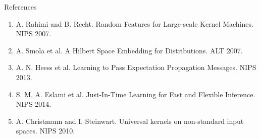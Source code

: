 \documentclass[english]{beamer}
\begin{document}
\begin{frame}
\begin{columns}[t]
\begin{block}{References}
{\footnotesize
\begin{enumerate}
\item \justifying{} { A. Rahimi and B. Recht. Random Features
for Large-scale Kernel Machines. NIPS 2007.}
\item A. Smola et al. A Hilbert Space Embedding for Distributions. ALT 2007.
\item { A. N. Heess et al. Learning to Pass Expectation Propagation Messages.
NIPS 2013. }
\item S. M. A. Eslami et al. Just-In-Time Learning for Fast and Flexible Inference.
    NIPS 2014.
\item A. Christmann and I. Steinwart. Universal kernels on non-standard input
    spaces. NIPS 2010.
\end{enumerate}
}

% 
% 


\end{block}



\end{columns}

\end{frame}
\end{document}
